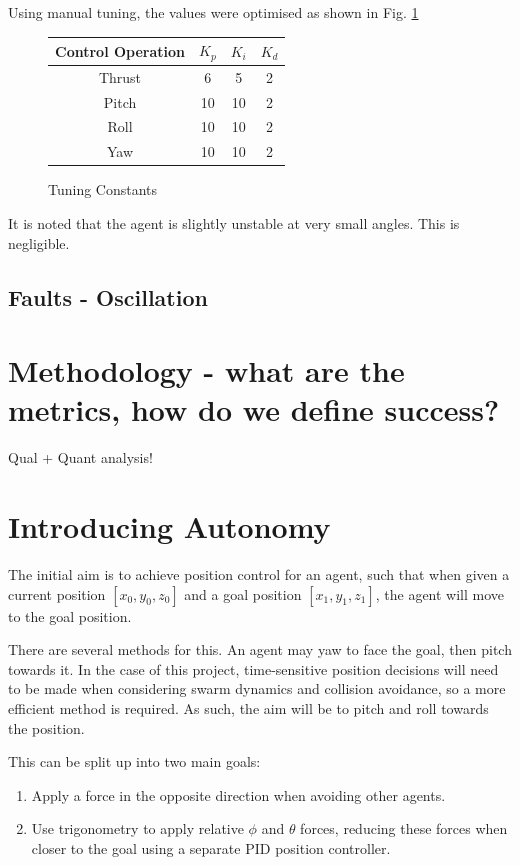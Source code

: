 \documentclass{article}
\begin{document}
Using manual tuning, the values were optimised as shown in Fig. \ref{fig:pid-tuning}

\begin{figure}[H]
    \centering
        \begin{tabular}{| c | c | c | c |} 
        \hline
        Control Operation & $K_p$ & $K_i$ & $K_d$ \\ 
        \hline
        Thrust & 6 & 5 & 2 \\
        \hline
        Pitch & 10 & 10 & 2 \\
        \hline
        Roll & 10 & 10 & 2 \\
        \hline
        Yaw & 10 & 10 & 2 \\
        \hline
        \end{tabular}
        \caption{Tuning Constants}
        \label{fig:pid-tuning}
\end{figure}

It is noted that the agent is slightly unstable at very small angles. This is negligible.

\subsection{Faults - Oscillation}

\section{Methodology - what are the metrics, how do we define success?}
Qual + Quant analysis!

\section{Introducing Autonomy}
The initial aim is to achieve position control for an agent, such that when given a current position $[x_0,y_0,z_0]$ and a goal position $[x_1,y_1,z_1]$, the agent will move to the goal position.

There are several methods for this. An agent may yaw to face the goal, then pitch towards it. In the case of this project, time-sensitive position decisions will need to be made when considering swarm dynamics and collision avoidance, so a more efficient method is required. As such, the aim will be to pitch and roll towards the position.

This can be split up into two main goals:
\begin{enumerate}
    \item Apply a force in the opposite direction when avoiding other agents.
    \item Use trigonometry to apply relative $\phi$ and $\theta$ forces, reducing these forces when closer to the goal using a separate PID position controller.
\end{enumerate}
\end{document}
